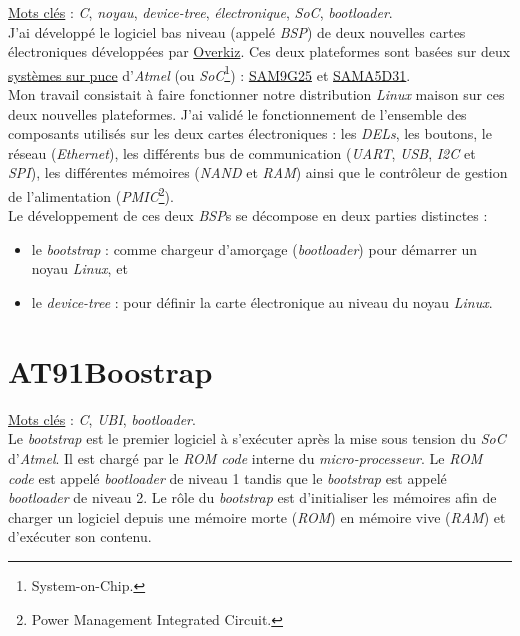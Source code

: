 \documentclass[a4paper]{article}
\begin{document}
\underline{Mots clés} : \textit{C}, \textit{noyau}, \textit{device-tree}, \textit{électronique}, \textit{SoC}, \textit{bootloader}.\\

J'ai développé le logiciel bas niveau (appelé \textit{BSP}) de deux nouvelles cartes électroniques développées par \href{http://www.overkiz.com/}{Overkiz}. Ces deux plateformes sont basées sur deux \href{https://fr.wikipedia.org/wiki/Syst\%C3\%A8me_sur_une_puce}{systèmes sur puce} d'\textit{Atmel} (ou \textit{SoC}\footnote{System-on-Chip.}) : \href{http://www.atmel.com/devices/SAM9G25.aspx}{SAM9G25} et \href{http://www.atmel.com/products/microcontrollers/arm/sama5.aspx}{SAMA5D31}.\\

Mon travail consistait à faire fonctionner notre distribution \textit{Linux} maison sur ces deux nouvelles plateformes. J'ai validé le fonctionnement de l'ensemble des composants utilisés sur les deux cartes électroniques : les \textit{DELs}, les boutons, le réseau (\textit{Ethernet}), les différents bus de communication (\textit{UART}, \textit{USB}, \textit{I2C} et \textit{SPI}), les différentes mémoires (\textit{NAND} et \textit{RAM}) ainsi que le contrôleur de gestion de l'alimentation (\textit{PMIC}\footnote{Power Management Integrated Circuit.}).\\

Le développement de ces deux \textit{BSP}s se décompose en deux parties distinctes :
\begin{itemize}
\item le \textit{bootstrap} : comme chargeur d'amorçage (\textit{bootloader}) pour démarrer un noyau \textit{Linux}, et
\item le \textit{device-tree} : pour définir la carte électronique au niveau du noyau \textit{Linux}.
\end{itemize}

\section{AT91Boostrap}

\underline{Mots clés} : \textit{C}, \textit{UBI}, \textit{bootloader}.\\

Le \textit{bootstrap} est le premier logiciel à s’exécuter après la mise sous tension du \textit{SoC} d'\textit{Atmel}. Il est chargé par le \textit{ROM code} interne du \textit{micro-processeur}. Le \textit{ROM code} est appelé \textit{bootloader} de niveau 1 tandis que le \textit{bootstrap} est appelé \textit{bootloader} de niveau 2. Le rôle du \textit{bootstrap} est d’initialiser les mémoires afin de charger un logiciel depuis une mémoire morte (\textit{ROM}) en mémoire vive (\textit{RAM}) et d’exécuter son contenu. \\
\end{document}
